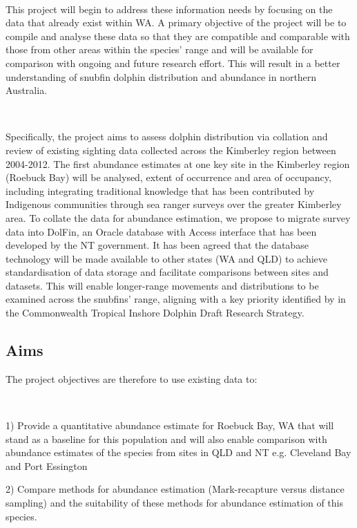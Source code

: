 \documentclass[version=last,
    paper=a4,                               %
    10pt,                                   %
    dvipsnames,
    oneside,                              %
    headings=openany,                       %
    open=any,
    BCOR=7mm,                               %
    DIV=15,     %
]{scrbook}
\begin{document}
~

This project will begin to address these information needs by focusing
on the data that already exist within WA. A primary objective of the
project will be to compile and analyse these data so that they are
compatible and comparable with those from other areas within the
species' range and will be available for comparison with ongoing and
future research effort. This will result in a better understanding of
snubfin dolphin distribution and abundance in northern Australia.

~

Specifically, the project aims to assess dolphin distribution via
collation and review of existing sighting data collected across the
Kimberley region between 2004-2012. The first abundance estimates at one
key site in the Kimberley region (Roebuck Bay) will be analysed, extent
of occurrence and area of occupancy, including integrating traditional
knowledge that has been contributed by Indigenous communities through
sea ranger surveys over the greater Kimberley area. To collate the data
for abundance estimation, we propose to migrate survey data into DolFin,
an Oracle database with Access interface that has been developed by the
NT government. It has been agreed that the database technology will be
made available to other states (WA and QLD) to achieve standardisation
of data storage and facilitate comparisons between sites and datasets.
This will enable longer-range movements and distributions to be examined
across the snubfins' range, aligning with a key priority identified by
in the Commonwealth Tropical Inshore Dolphin Draft Research Strategy.




\subsection*{Aims}

The project objectives are therefore to use existing data to:

~

1) Provide a quantitative abundance estimate for Roebuck Bay, WA that
will stand as a baseline for this population and will also enable
comparison with abundance estimates of the species from sites in QLD and
NT e.g. Cleveland Bay and Port Essington

2) Compare methods for abundance estimation (Mark-recapture versus
distance sampling) and the suitability of these methods for abundance
estimation of this species.
\end{document}
